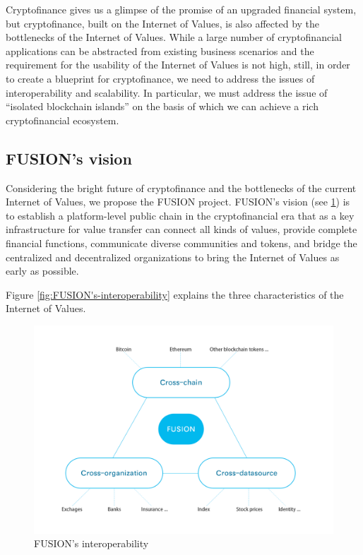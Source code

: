 \documentclass[a4paper,12pt]{article}
\begin{document}
Cryptofinance gives us a glimpse of the promise of an upgraded financial system, but cryptofinance, built on the Internet of Values, is also affected by the bottlenecks of the Internet of Values. While a large number of cryptofinancial applications can be abstracted from existing business scenarios and the requirement for the usability of the Internet of Values is not high, still, in order to create a blueprint for cryptofinance, we need to address the issues of interoperability and scalability. In particular, we must address the issue of “isolated blockchain islands” on the basis of which we can achieve a rich cryptofinancial ecosystem.

\subsection{FUSION's vision}

Considering the bright future of cryptofinance and the bottlenecks of the current Internet of Values, we propose the FUSION project. FUSION's vision (see \ref{fig: FUSION's-interoperability}) is to establish a platform-level public chain in the cryptofinancial era that as a key infrastructure for value transfer can connect all kinds of values, provide complete financial functions, communicate diverse communities and tokens, and bridge the centralized and decentralized organizations to bring the Internet of Values as early as possible. 


Figure \ref {fig:FUSION's-interoperability} explains the three characteristics of the Internet of Values.

\begin {figure} [htbp]
\centering \includegraphics [width = 5in] {pic_cn/FUSION's-interoperability.png}
\caption {FUSION's interoperability} \label {fig: FUSION's-interoperability}
\end {figure}
\end{document}
